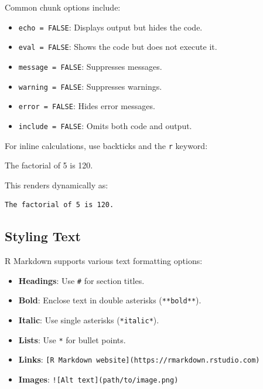 \documentclass[
  11pt,
]{book}
\makeatletter
\newenvironment{Shaded}{}{}
\newcommand{\NormalTok}[1]{#1}
\providecommand{\tightlist}{%
  \setlength{\itemsep}{0pt}\setlength{\parskip}{0pt}}
\newenvironment{kframe}{%
\medskip{}
\setlength{\fboxsep}{.8em}
 \def\at@end@of@kframe{}%
 \ifinner\ifhmode%
  \def\at@end@of@kframe{\end{minipage}}%
  \begin{minipage}{\columnwidth}%
 \fi\fi%
 \def\FrameCommand##1{\hskip\@totalleftmargin \hskip-\fboxsep
 \colorbox{shadecolor}{##1}\hskip-\fboxsep
     \hskip-\linewidth \hskip-\@totalleftmargin \hskip\columnwidth}%
 \MakeFramed {\advance\hsize-\width
   \@totalleftmargin\z@ \linewidth\hsize
   \@setminipage}}%
 {\par\unskip\endMakeFramed%
 \at@end@of@kframe}
\renewenvironment{Shaded}{\begin{kframe}}{\end{kframe}}
\theoremstyle{definition}
\theoremstyle{definition}
\theoremstyle{definition}
\theoremstyle{definition}
\theoremstyle{remark}
\makeatother
\begin{document}
Common chunk options include:

\begin{itemize}
\tightlist
\item
  \texttt{echo\ =\ FALSE}: Displays output but hides the code.\\
\item
  \texttt{eval\ =\ FALSE}: Shows the code but does not execute it.\\
\item
  \texttt{message\ =\ FALSE}: Suppresses messages.\\
\item
  \texttt{warning\ =\ FALSE}: Suppresses warnings.\\
\item
  \texttt{error\ =\ FALSE}: Hides error messages.\\
\item
  \texttt{include\ =\ FALSE}: Omits both code and output.
\end{itemize}

For inline calculations, use backticks and the \texttt{r} keyword:

\begin{Shaded}
\begin{Highlighting}[]
\NormalTok{The factorial of 5 is 120.}
\end{Highlighting}
\end{Shaded}

This renders dynamically as:

\begin{verbatim}
The factorial of 5 is 120.
\end{verbatim}

\subsection*{Styling Text}\label{styling-text}


R Markdown supports various text formatting options:

\begin{itemize}
\tightlist
\item
  \textbf{Headings}: Use \texttt{\#} for section titles.\\
\item
  \textbf{Bold}: Enclose text in double asterisks (\texttt{**bold**}).\\
\item
  \textbf{Italic}: Use single asterisks (\texttt{*italic*}).\\
\item
  \textbf{Lists}: Use \texttt{*} for bullet points.\\
\item
  \textbf{Links}: \texttt{{[}R\ Markdown\ website{]}(https://rmarkdown.rstudio.com)}\\
\item
  \textbf{Images}: \texttt{!{[}Alt\ text{]}(path/to/image.png)}
\end{itemize}
\end{document}
